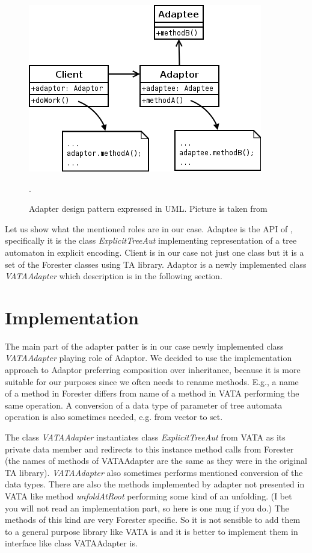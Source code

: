 \begin{figure}
	\begin{center}
		\includegraphics[scale=0.5]{fig/adapter.png}
	\end{center}
	\caption{Adapter design pattern expressed in UML.
	Picture is taken from \cite{wiki:adapter}}.
	\label{fig:adapter}
\end{figure}

Let us show what the mentioned roles are in our case.
Adaptee is the API of \vata, specifically it is the class \emph{ExplicitTreeAut} implementing representation of a tree automaton in explicit encoding.
Client is in our case not just one class but it is a set of the Forester classes using TA library.
Adaptor is a newly implemented class \emph{VATAAdapter} which description is in the following section.

\section{Implementation}
\label{sec:fova_impl}

The main part of the adapter patter is in our case newly implemented class \emph{VATAAdapter} playing role of Adaptor.
We decided to use the implementation approach to Adaptor preferring composition over inheritance,
because it is more suitable for our purposes since we often needs to rename methods.
E.g., a name of a method in Forester differs from name of a method in VATA performing the same operation.
A conversion of a data type of parameter of tree automata operation is also sometimes needed, e.g. from vector to set. 

The class \emph{VATAAdapter} instantiates class \emph{ExplicitTreeAut} from VATA as its private data member
and redirects to this instance method calls from Forester (the names of methods of VATAAdapter are the same as they were
in the original TA library).
\emph{VATAAdapter} also sometimes performs mentioned conversion of the data types.
There are also the methods implemented by adapter not presented
in VATA like method \emph{unfoldAtRoot} performing some kind of an unfolding.
(I bet you will not read an implementation part, so here is one mug if you do.) %
The methods of this kind are very Forester specific.
So it is not sensible to add them to a general purpose library like VATA is
and it is better to implement them in interface like class VATAAdapter is.

